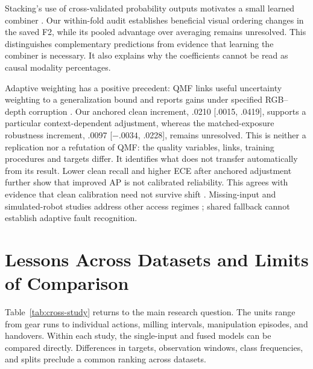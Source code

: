 Stacking's use of cross-validated probability outputs motivates a small learned combiner
\citep{Ting1999Issues}. Our within-fold audit establishes beneficial visual ordering
changes in the saved F2, while its pooled advantage over averaging remains unresolved.
This distinguishes complementary predictions from evidence that learning the combiner is
necessary. It also explains why the coefficients cannot be read as causal modality
percentages.

Adaptive weighting has a positive precedent: QMF links useful uncertainty weighting to a
generalization bound and reports gains under specified RGB--depth corruption
\citep{Zhang2023QMF}. Our anchored clean increment, .0210 [.0015, .0419], supports a
particular context-dependent adjustment, whereas the matched-exposure robustness
increment, .0097 [$-.0034$, .0228], remains unresolved. This is neither a replication
nor a refutation of QMF: the quality variables, links, training procedures and targets
differ. It identifies what does not transfer automatically from its result. Lower clean
recall and higher ECE after anchored adjustment further show that improved AP is not
calibrated reliability. This agrees with evidence that clean calibration need not
survive shift \citep{P008}. Missing-input and simulated-robot studies address other
access regimes \citep{P026,Altinses2023Fuzzy}; shared fallback cannot establish adaptive
fault recognition.

\section{Lessons Across Datasets and Limits of Comparison}
Table~\ref{tab:cross-study} returns to the main research question. The units range from
gear runs to individual actions, milling intervals, manipulation episodes, and
handovers. Within each study, the single-input and fused models can be compared
directly. Differences in targets, observation windows, class frequencies, and splits
preclude a common ranking across datasets.

